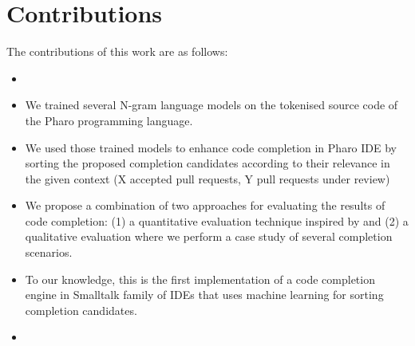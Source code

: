 \section{Contributions}
\label{sec:Introduction-Contributions}
The contributions of this work are as follows:
\begin{itemize}
    \item {}
    \item We trained several N-gram language models on the tokenised source code of the Pharo programming language.
    \item We used those trained models to enhance code completion in Pharo IDE by sorting the proposed completion candidates according to their relevance in the given context (X accepted pull requests, Y pull requests under review) 
    \item We propose a combination of two approaches for evaluating the results of code completion: (1) a quantitative evaluation technique inspired by \cite{Robb08a} and (2) a qualitative evaluation where we perform a case study of  several completion scenarios.
    \item To our knowledge, this is the first implementation of a code completion engine in Smalltalk family of IDEs that uses machine learning for sorting completion candidates.
    \item {}
\end{itemize}

